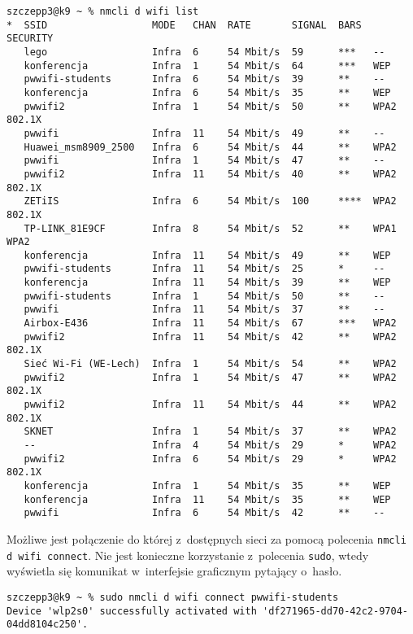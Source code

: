 \documentclass[a4paper,11pt]{article}
\begin{document}
\begin{verbatim}
szczepp3@k9 ~ % nmcli d wifi list
*  SSID                  MODE   CHAN  RATE       SIGNAL  BARS  SECURITY    
   lego                  Infra  6     54 Mbit/s  59      ***   --          
   konferencja           Infra  1     54 Mbit/s  64      ***   WEP         
   pwwifi-students       Infra  6     54 Mbit/s  39      **    --          
   konferencja           Infra  6     54 Mbit/s  35      **    WEP         
   pwwifi2               Infra  1     54 Mbit/s  50      **    WPA2 802.1X 
   pwwifi                Infra  11    54 Mbit/s  49      **    --          
   Huawei_msm8909_2500   Infra  6     54 Mbit/s  44      **    WPA2        
   pwwifi                Infra  1     54 Mbit/s  47      **    --          
   pwwifi2               Infra  11    54 Mbit/s  40      **    WPA2 802.1X 
   ZETiIS                Infra  6     54 Mbit/s  100     ****  WPA2 802.1X 
   TP-LINK_81E9CF        Infra  8     54 Mbit/s  52      **    WPA1 WPA2   
   konferencja           Infra  11    54 Mbit/s  49      **    WEP         
   pwwifi-students       Infra  11    54 Mbit/s  25      *     --          
   konferencja           Infra  11    54 Mbit/s  39      **    WEP         
   pwwifi-students       Infra  1     54 Mbit/s  50      **    --          
   pwwifi                Infra  11    54 Mbit/s  37      **    --          
   Airbox-E436           Infra  11    54 Mbit/s  67      ***   WPA2        
   pwwifi2               Infra  11    54 Mbit/s  42      **    WPA2 802.1X 
   Sieć Wi-Fi (WE-Lech)  Infra  1     54 Mbit/s  54      **    WPA2        
   pwwifi2               Infra  1     54 Mbit/s  47      **    WPA2 802.1X 
   pwwifi2               Infra  11    54 Mbit/s  44      **    WPA2 802.1X 
   SKNET                 Infra  1     54 Mbit/s  37      **    WPA2        
   --                    Infra  4     54 Mbit/s  29      *     WPA2        
   pwwifi2               Infra  6     54 Mbit/s  29      *     WPA2 802.1X 
   konferencja           Infra  1     54 Mbit/s  35      **    WEP         
   konferencja           Infra  11    54 Mbit/s  35      **    WEP         
   pwwifi                Infra  6     54 Mbit/s  42      **    --
\end{verbatim}

Możliwe jest połączenie do której z~dostępnych sieci za pomocą polecenia
\verb|nmcli d wifi connect|. Nie jest konieczne korzystanie z~polecenia
\verb|sudo|, wtedy wyświetla się komunikat w~interfejsie graficznym
pytający o~hasło.

\begin{verbatim}
szczepp3@k9 ~ % sudo nmcli d wifi connect pwwifi-students
Device 'wlp2s0' successfully activated with 'df271965-dd70-42c2-9704-04dd8104c250'.
\end{verbatim}
\end{document}
